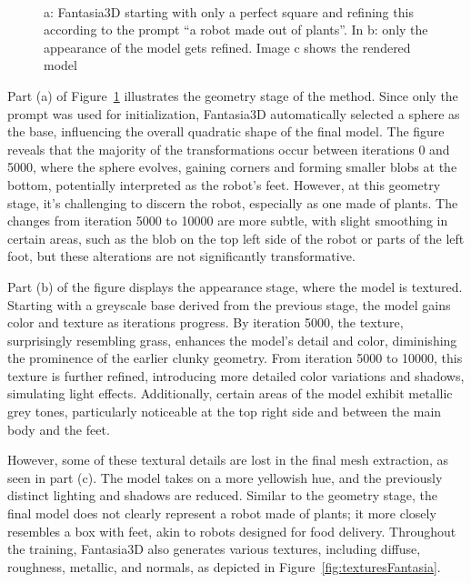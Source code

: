 \begin{figure}[H]
\begin{subfigure}[b]{0.37\textwidth}
        \caption{}
    \end{subfigure}
    \caption{a: Fantasia3D starting with only a perfect square and refining this according to the prompt ``a robot made out of plants''. In b: only the appearance of the model gets refined. Image c shows the rendered model }~\label{fig:generationFantasia}
\end{figure}

Part (a) of Figure~\ref{fig:generationFantasia} illustrates the geometry stage of the method. Since only the prompt was used for initialization, Fantasia3D automatically selected a sphere as the base, influencing the overall quadratic shape of the final model. The figure reveals that the majority of the transformations occur between iterations 0 and 5000, where the sphere evolves, gaining corners and forming smaller blobs at the bottom, potentially interpreted as the robot's feet. However, at this geometry stage, it's challenging to discern the robot, especially as one made of plants. The changes from iteration 5000 to 10000 are more subtle, with slight smoothing in certain areas, such as the blob on the top left side of the robot or parts of the left foot, but these alterations are not significantly transformative.

Part (b) of the figure displays the appearance stage, where the model is textured. Starting with a greyscale base derived from the previous stage, the model gains color and texture as iterations progress. By iteration 5000, the texture, surprisingly resembling grass, enhances the model's detail and color, diminishing the prominence of the earlier clunky geometry. From iteration 5000 to 10000, this texture is further refined, introducing more detailed color variations and shadows, simulating light effects. Additionally, certain areas of the model exhibit metallic grey tones, particularly noticeable at the top right side and between the main body and the feet. 

However, some of these textural details are lost in the final mesh extraction, as seen in part (c). The model takes on a more yellowish hue, and the previously distinct lighting and shadows are reduced. Similar to the geometry stage, the final model does not clearly represent a robot made of plants; it more closely resembles a box with feet, akin to robots designed for food delivery. Throughout the training, Fantasia3D also generates various textures, including diffuse, roughness, metallic, and normals, as depicted in Figure~\ref{fig:texturesFantasia}.

